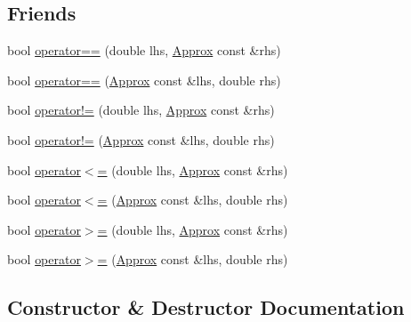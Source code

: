 \subsection*{Friends}
\begin{DoxyCompactItemize}
\item 
bool \hyperlink{class_catch_1_1_detail_1_1_approx_ac766f044f1c63f0c5997982baefd9049}{operator==} (double lhs, \hyperlink{class_catch_1_1_detail_1_1_approx}{Approx} const \&rhs)
\item 
bool \hyperlink{class_catch_1_1_detail_1_1_approx_a35999631e6cef569f9da9f3fa910db22}{operator==} (\hyperlink{class_catch_1_1_detail_1_1_approx}{Approx} const \&lhs, double rhs)
\item 
bool \hyperlink{class_catch_1_1_detail_1_1_approx_a83b3763569a7ecc143c335b630be0e47}{operator!=} (double lhs, \hyperlink{class_catch_1_1_detail_1_1_approx}{Approx} const \&rhs)
\item 
bool \hyperlink{class_catch_1_1_detail_1_1_approx_a7497ef839f8026cc0edd6269a80f3e09}{operator!=} (\hyperlink{class_catch_1_1_detail_1_1_approx}{Approx} const \&lhs, double rhs)
\item 
bool \hyperlink{class_catch_1_1_detail_1_1_approx_aa2bfad80c8c138eac1f0b56910a7d3f2}{operator$<$=} (double lhs, \hyperlink{class_catch_1_1_detail_1_1_approx}{Approx} const \&rhs)
\item 
bool \hyperlink{class_catch_1_1_detail_1_1_approx_a75c9382b61421ffab3559c3506182d8f}{operator$<$=} (\hyperlink{class_catch_1_1_detail_1_1_approx}{Approx} const \&lhs, double rhs)
\item 
bool \hyperlink{class_catch_1_1_detail_1_1_approx_a4e60095c615a0e6bdd6e8663cd24090b}{operator$>$=} (double lhs, \hyperlink{class_catch_1_1_detail_1_1_approx}{Approx} const \&rhs)
\item 
bool \hyperlink{class_catch_1_1_detail_1_1_approx_adaba11ee9aabb4d51d4855f09aa7f7df}{operator$>$=} (\hyperlink{class_catch_1_1_detail_1_1_approx}{Approx} const \&lhs, double rhs)
\end{DoxyCompactItemize}


\subsection{Constructor \& Destructor Documentation}
\mbox{\label{class_catch_1_1_detail_1_1_approx_a1a8618ea8db08c66bd3d9fe8f74b957a}} 
